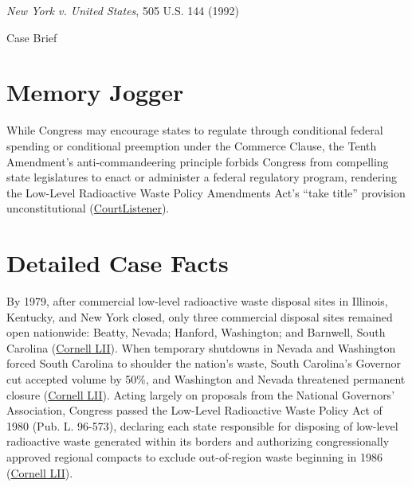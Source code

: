 \documentclass[12pt]{article}
\begin{document}
\begin{center}
{\LARGE \textit{New York v. United States}, 505 U.S. 144 (1992)\par}
\vspace{0.8em}
{\large Case Brief\par}
\end{center}
\vspace{1em}

\section{Memory Jogger}

While Congress may encourage states to regulate through conditional federal spending or conditional preemption under the Commerce Clause, the Tenth Amendment's anti-commandeering principle forbids Congress from compelling state legislatures to enact or administer a federal regulatory program, rendering the Low-Level Radioactive Waste Policy Amendments Act's ``take title'' provision unconstitutional (\href{https://www.courtlistener.com/opinion/112768/new-york-v-united-states/}{CourtListener}).

\section{Detailed Case Facts}

By 1979, after commercial low-level radioactive waste disposal sites in Illinois, Kentucky, and New York closed, only three commercial disposal sites remained open nationwide: Beatty, Nevada; Hanford, Washington; and Barnwell, South Carolina (\href{https://www.law.cornell.edu/supremecourt/text/505/144}{Cornell LII}). When temporary shutdowns in Nevada and Washington forced South Carolina to shoulder the nation's waste, South Carolina's Governor cut accepted volume by 50\%, and Washington and Nevada threatened permanent closure (\href{https://www.law.cornell.edu/supremecourt/text/505/144}{Cornell LII}). Acting largely on proposals from the National Governors' Association, Congress passed the Low-Level Radioactive Waste Policy Act of 1980 (Pub. L. 96-573), declaring each state responsible for disposing of low-level radioactive waste generated within its borders and authorizing congressionally approved regional compacts to exclude out-of-region waste beginning in 1986 (\href{https://www.law.cornell.edu/supremecourt/text/505/144}{Cornell LII}).
\end{document}
